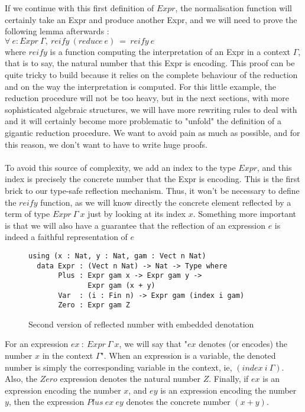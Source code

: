 If we continue with this first definition of $Expr$, the normalisation function will certainly take an Expr and produce another Expr, and we will need to prove the following lemma afterwards : \\
$\forall\ e:Expr\ \Gamma,\ reify\ (reduce\ e)\ =\ reify\ e$ \\
where $reify$ is a function computing the interpretation of an Expr in a context $\Gamma$, that is to say, the natural number that this Expr is encoding.
This proof can be quite tricky to build because it relies on the complete behaviour of the reduction and on the way the interpretation is computed.
For this little example, the reduction procedure will not be too heavy, but in the next sections, with more sophisticated algebraic structures, we will have more rewriting rules to deal with and it will certainly become more problematic to "unfold" the definition of a gigantic reduction procedure. We want to avoid pain as much as possible, and for this reason, we don't want to have to write huge proofs. \\
\\
To avoid this source of complexity, we add an index to the type $Expr$, and this index is precisely the concrete number that the Expr is encoding. This is the first brick to our type-safe reflection mechanism. Thus, it won't be necessary to define the $reify$ function, as we will know directly the concrete element reflected by a term of type $Expr\ \Gamma\ x$ just by looking at its index $x$. Something more important is that we will also have a guarantee that the reflection of an expression $e$ is indeed a faithful representation of $e$ \\

\begin{figure}[H]
\figrule
\begin{center}
\begin{verbatim}
using (x : Nat, y : Nat, gam : Vect n Nat)
  data Expr : (Vect n Nat) -> Nat -> Type where
       Plus : Expr gam x -> Expr gam y -> 
              Expr gam (x + y)
       Var  : (i : Fin n) -> Expr gam (index i gam)
       Zero : Expr gam Z
\end{verbatim}
\end{center}
\caption{Second version of reflected number with embedded denotation}
\figrule
\end{figure}

For an expression $ex\ :\ Expr\ \Gamma\ x$, we will say that "$ex$ denotes (or encodes) the number $x$ in the context $\Gamma$".
When an expression is a variable, the denoted number is simply the corresponding variable in the context, ie, $(index\ i\ \Gamma)$.
Also, the $Zero$ expression denotes the natural number $Z$.
Finally, if $ex$ is an expression encoding the number $x$, and $ey$ is an expression encoding the number $y$, then the expression $Plus\ ex\ ey$ denotes the concrete number $(x + y)$.


